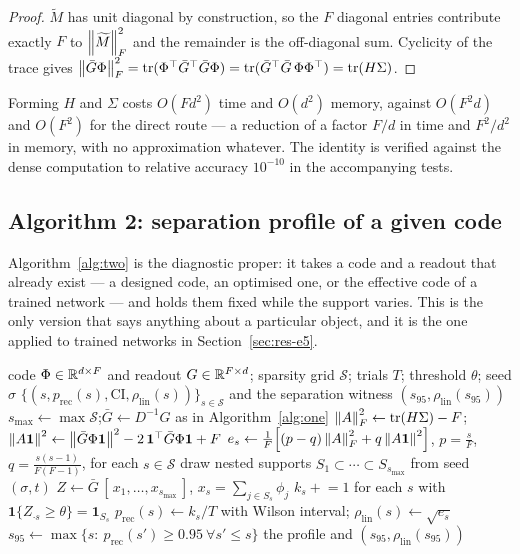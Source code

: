 \begin{proof}
$\widetilde M$ has unit diagonal by construction, so the $F$ diagonal entries contribute
exactly $F$ to $\left\lVert \widetilde M \right\rVert_F^2$ and the remainder is the off-diagonal sum. Cyclicity
of the trace gives $\left\lVert \bar G\Phi \right\rVert_F^2=\operatorname{tr}(\Phi^{\top}\bar G^{\top}\bar
G\Phi)=\operatorname{tr}(\bar G^{\top}\bar G\,\Phi\Phi^{\top})=\operatorname{tr}(H\Sigma)$.
\end{proof}

Forming $H$ and $\Sigma$ costs $O(Fd^2)$ time and $O(d^2)$ memory, against $O(F^2d)$ and
$O(F^2)$ for the direct route --- a reduction of a factor $F/d$ in time and $F^2/d^2$ in
memory, with no approximation whatever. The identity is verified against the dense computation
to relative accuracy $10^{-10}$ in the accompanying tests.

\subsection{Algorithm 2: separation profile of a given code}

Algorithm~\ref{alg:two} is the diagnostic proper: it takes a code and a readout that already
exist --- a designed code, an optimised one, or the effective code of a trained network --- and
holds them fixed while the support varies. This is the only version that says anything about a
particular object, and it is the one applied to trained networks in
Section~\ref{sec:res-e5}.

\begin{algorithm}[t]
\caption{\textsc{SeparationProfile} --- support recovery versus irreducible analog error, on a
fixed code}
\label{alg:two}
\begin{algorithmic}[1]
\Require code $\Phi\in\mathbb{R}^{d\times F}$ and readout $G\in\mathbb{R}^{F\times d}$; sparsity grid
  $\mathcal S$; trials $T$; threshold $\theta$; seed $\sigma$
\Ensure $\{(s,p_{\mathrm{rec}}(s),\text{CI},\rho_{\mathrm{lin}}(s))\}_{s\in\mathcal S}$ and the
  separation witness $(s_{95},\rho_{\mathrm{lin}}(s_{95}))$
\State $s_{\max}\gets\max\mathcal S$;\quad $\bar G\gets D^{-1}G$ as in
  Algorithm~\ref{alg:one}
\State $\left\lVert A \right\rVert_F^2\gets\operatorname{tr}(H\Sigma)-F$;\quad
       $\left\lVert A\mathbf 1 \right\rVert^2\gets\left\lVert \bar G\Phi\mathbf 1 \right\rVert^2
       -2\,\mathbf 1^{\top}\bar G\Phi\mathbf 1+F$
\State $e_s\gets\frac1F\!\left[(p-q)\left\lVert A \right\rVert_F^2+q\left\lVert A\mathbf 1 \right\rVert^2\right]$,
  $p=\tfrac sF$, $q=\tfrac{s(s-1)}{F(F-1)}$, for each $s\in\mathcal S$
  \State draw nested supports $S_1\subset\cdots\subset S_{s_{\max}}$ from seed $(\sigma,t)$
  \State $Z\gets\bar G\,[\,x_1,\dots,x_{s_{\max}}\,]$, $x_s=\sum_{j\in S_s}\phi_j$
  \State $k_s\mathrel{+}=1$ for each $s$ with $\mathbf 1\{Z_{\cdot s}\ge\theta\}=\mathbf 1_{S_s}$
\EndFor
\State $p_{\mathrm{rec}}(s)\gets k_s/T$ with Wilson interval;\quad
       $\rho_{\mathrm{lin}}(s)\gets\sqrt{e_s}$
\State $s_{95}\gets\max\{s:\ p_{\mathrm{rec}}(s')\ge0.95\ \forall s'\le s\}$
\State \Return the profile and $(s_{95},\rho_{\mathrm{lin}}(s_{95}))$
\end{algorithmic}
\end{algorithm}

